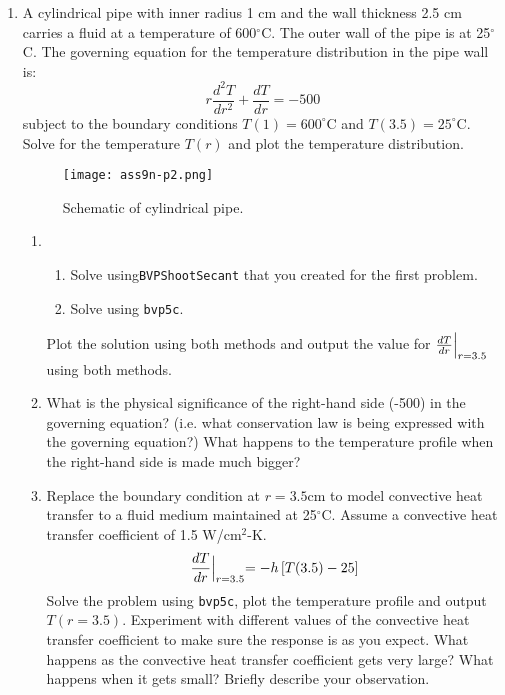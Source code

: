 \begin{fullwidth}
\begin{enumerate}
\item A cylindrical pipe with inner radius 1 cm and the wall thickness 2.5 cm carries a fluid at a temperature of 600$^{\circ}$C. The outer wall of the pipe is at 25$^{\circ}$C.  The governing equation for the temperature distribution in the pipe wall is:
\begin{equation*}
r\frac{d^2T}{dr^2}+\frac{dT}{dr}=-500
\end{equation*}
subject to the boundary conditions $T(1)=600^{\circ}$C and $T(3.5)=25^{\circ}$C.  Solve for the temperature $T(r)$ and plot the temperature distribution.

\begin{figure}[h!]
\centering
\texttt{[image: ass9n-p2.png]}
\caption{Schematic of cylindrical pipe.}
\label{fig:ass9n-p2}
\end{figure}

\begin{enumerate}
\item
\begin{enumerate}
\item Solve using\lstinline[style=myMatlab]{BVPShootSecant} that you created for the first problem.
\item Solve using \lstinline[style=myMatlab]{bvp5c}.
\end{enumerate}
Plot the solution using both methods and output the value for $\frac{dT}{dr}\Bigl|_{r=3.5}$ using both methods.

\item 
What is the physical significance of the right-hand side (-500) in the governing equation?  (i.e. what conservation law is being expressed with the governing equation?) What happens to the temperature profile when the right-hand side is made much bigger?

\item 
Replace the boundary condition at $r=3.5$cm to model convective heat transfer to a fluid medium maintained at 25$^{\circ}$C.  Assume a convective heat transfer coefficient of 1.5 W/cm$^2$-K.  
\begin{equation*}
\frac{dT}{dr}\Bigl|_{r=3.5}=-h\left[T(3.5)-25\right]
\end{equation*}
Solve the problem using \lstinline[style=myMatlab]{bvp5c}, plot the temperature profile and output $T(r=3.5)$.  Experiment with different values of the convective heat transfer coefficient to make sure the response is as you expect.  What happens as the convective heat transfer coefficient gets very large?  What happens when it gets small?  Briefly describe your observation.



\end{enumerate}
\end{enumerate}
\end{fullwidth}
